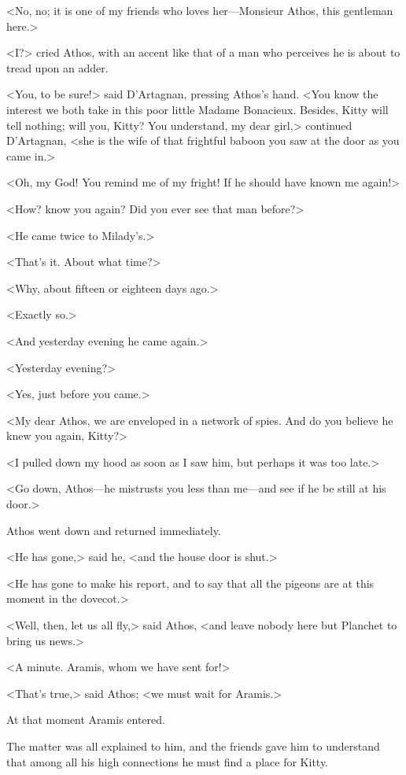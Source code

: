 <No, no; it is one of my friends who loves her—Monsieur Athos, this gentleman here.> 

<I?> cried Athos, with an accent like that of a man who perceives he is about to tread upon an adder. 

<You, to be sure!> said D'Artagnan, pressing Athos's hand. <You know the interest we both take in this poor little Madame Bonacieux. Besides, Kitty will tell nothing; will you, Kitty? You understand, my dear girl,> continued D'Artagnan, <she is the wife of that frightful baboon you saw at the door as you came in.> 

<Oh, my God! You remind me of my fright! If he should have known me again!> 

<How? know you again? Did you ever see that man before?> 

<He came twice to Milady's.> 

<That's it. About what time?> 

<Why, about fifteen or eighteen days ago.> 

<Exactly so.> 

<And yesterday evening he came again.> 

<Yesterday evening?> 

<Yes, just before you came.> 

<My dear Athos, we are enveloped in a network of spies. And do you believe he knew you again, Kitty?> 

<I pulled down my hood as soon as I saw him, but perhaps it was too late.> 

<Go down, Athos—he mistrusts you less than me—and see if he be still at his door.> 

Athos went down and returned immediately. 

<He has gone,> said he, <and the house door is shut.> 

<He has gone to make his report, and to say that all the pigeons are at this moment in the dovecot.> 

<Well, then, let us all fly,> said Athos, <and leave nobody here but Planchet to bring us news.> 

<A minute. Aramis, whom we have sent for!> 

<That's true,> said Athos; <we must wait for Aramis.> 

At that moment Aramis entered. 

The matter was all explained to him, and the friends gave him to understand that among all his high connections he must find a place for Kitty. 

